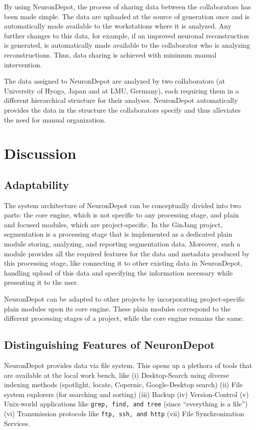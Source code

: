 \documentclass{frontiersSCNS} %
\begin{document}
By using NeuronDepot, the process of sharing data between the collaborators has
been made simple. The data are uploaded at the source of generation once and is
automatically made available to the workstations where it is analyzed. Any
further changes to this data, for example, if an improved neuronal
reconstruction is generated, is automatically made available to the
collaborator who is analyzing reconstructions. Thus, data sharing is achieved
with minimum manual intervention.

The data assigned to NeuronDepot are analyzed by two collaborators (at
University of Hyogo, Japan and at LMU, Germany), each requiring them in a
different hierarchical structure for their analyses. NeuronDepot automatically
provides the data in the structure the collaborators specify and thus
alleviates the need for manual organization.

\section{Discussion}

\subsection{Adaptability}
The system architecture of NeuronDepot can be conceptually divided into two
parts: the core engine, which is not specific to any processing stage, and
plain and focused modules, which are project-specific. In the GinJang project,
segmentation is a processing stage that is implemented as a dedicated plain
module storing, analyzing, and reporting segmentation data. Moreover, such a
module provides all the required features for the data and metadata produced by
this processing stage, like connecting it to other existing data in
NeuronDepot, handling upload of this data and specifying the information
necessary while presenting it to the user.

NeuronDepot can be adapted to other projects by incorporating project-specific
plain modules upon its core engine. These plain modules correspond to the
different processing stages of a project, while the core engine
remains the same.

\subsection{Distinguishing Features of NeuronDepot}

NeuronDepot provides data via file system. This opens up a plethora of tools
that are available at the local work bench, like (i) Desktop-Search using
diverse indexing methods (spotlight, locate, Copernic, Google-Desktop search)
(ii) File system explorers (for searching and sorting) (iii) Backup (iv)
Version-Control (v) Unix-world applications like \texttt{grep, find, and tree}
(since ``everything is a file'') (vi) Transmission protocols like \texttt{ftp,
ssh, and http} (vii) File Synchronization Services.
\end{document}
